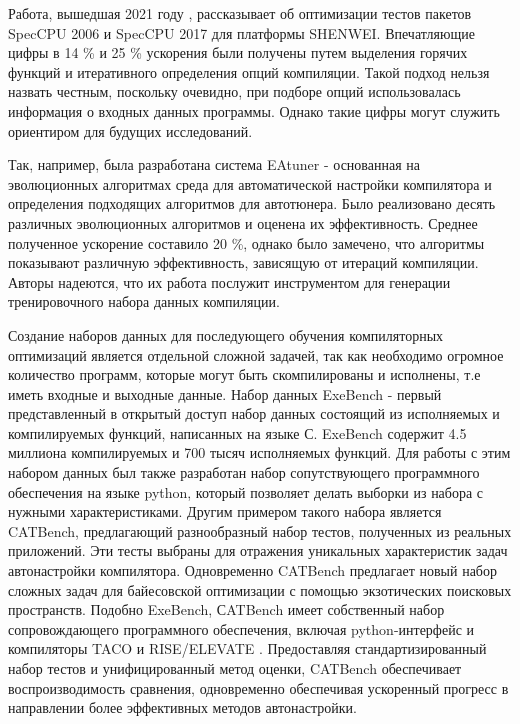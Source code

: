 Работа, вышедшая 2021 году \cite{wei2021compiler}, рассказывает об оптимизации тестов пакетов SpecCPU 2006 и SpecCPU 2017 для платформы SHENWEI. Впечатляющие цифры в 14 \% и 25 \% ускорения были получены путем выделения горячих функций и итеративного определения опций компиляции. Такой подход нельзя назвать честным, поскольку очевидно, при подборе опций использовалась информация о входных данных программы. Однако такие цифры могут служить ориентиром для будущих исследований. 

Так, например, была разработана система EAtuner \cite{xiao2024eatuner} -  основанная на эволюционных алгоритмах среда для автоматической настройки компилятора и определения подходящих алгоритмов для автотюнера. Было реализовано десять различных эволюционных алгоритмов и оценена их эффективность. Среднее полученное ускорение составило 20 \%, однако было замечено, что алгоритмы показывают различную эффективность, зависящую от итераций компиляции. Авторы надеются, что их работа послужит инструментом для генерации тренировочного набора данных компиляции. 

Создание наборов данных для последующего обучения компиляторных оптимизаций является отдельной сложной задачей, так как необходимо огромное количество программ, которые могут быть скомпилированы и исполнены, т.е иметь входные и выходные данные. Набор данных ExeBench \cite{armengol2022exebench}  - первый представленный в открытый доступ набор данных состоящий из исполняемых и компилируемых функций, написанных на языке С. ExeBench содержит 4.5 миллиона компилируемых и 700 тысяч исполняемых функций. Для работы с этим набором данных был также разработан набор сопутствующего программного обеспечения на языке python, который позволяет делать выборки из набора с нужными характеристиками. Другим примером такого набора является CATBench, предлагающий разнообразный набор тестов, полученных из реальных приложений.
Эти тесты выбраны для отражения уникальных характеристик задач автонастройки компилятора.
Одновременно CATBench предлагает новый набор сложных задач для байесовской оптимизации с помощью
экзотических поисковых пространств. Подобно ExeBench, СATBench имеет собственный набор сопровождающего программного обеспечения, включая python-интерфейс и компиляторы TACO \cite{kjolstad2017taco} и RISE/ELEVATE \cite{steuwer2022rise}.
Предоставляя стандартизированный набор тестов и унифицированный метод оценки, CATBench обеспечивает воспроизводимость сравнения, одновременно обеспечивая ускоренный прогресс в направлении более эффективных методов автонастройки.

